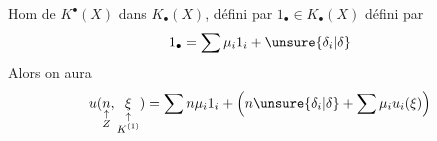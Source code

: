 Hom de $K^\bullet(X)$ dans $K_\bullet(X)$, défini par $1_\bullet\in K_\bullet(X)$
défini par
\[
1_\bullet=\sum\mu_i1_i+\unsure{\delta_i|\delta}
\]
Alors on aura
\[
u(\underset{\substack{\uparrow\\Z}}{n},\underset{\substack{\uparrow\\K^{(1)}}}{\xi})
=\sum n\mu_i1_i+\left(n\unsure{\delta_i|\delta}+\sum\mu_i u_i(\xi)\right)
\]

\deleted{$c_\bullet(\xi_\bullet)=\deleted{\unsure{\xi}}\bigl[(\operatorname{lg}_i(\unsure{\xi_\bullet})),\xi_\bullet-\sum\operatorname{lg}_i(\unsure{\xi_\bullet})1_i-$}

